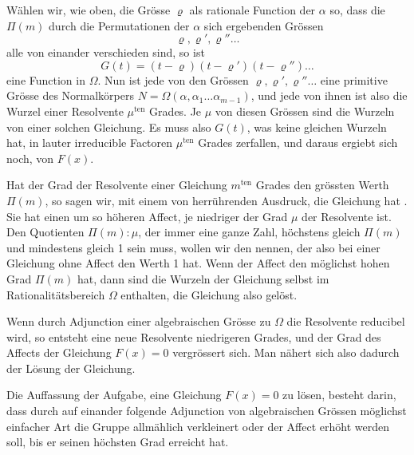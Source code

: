 
Wählen wir, wie oben, die Grösse $\varrho$ als rationale Function der $\alpha$ so, dass die $\Pi(m)$ durch die Permutationen der $\alpha$ sich ergebenden Grössen
\[
\varrho, \varrho', \varrho'' \ldots
\]
alle von einander verschieden sind, so ist
\[
G(t) = (t - \varrho)(t - \varrho')(t - \varrho'') \ldots
\]
eine Function in $\Omega$. Nun ist jede von den Grössen $\varrho, \varrho', \varrho'' \ldots$ eine primitive Grösse des Normalkörpers $N = \Omega(\alpha, \alpha_1 \ldots \alpha_{m-1})$, und jede von ihnen ist also die Wurzel einer  Resolvente $\mu^{\text{ten}}$ Grades. Je $\mu$ von diesen Grössen sind die Wurzeln von einer solchen Gleichung. Es muss also $G(t)$, was keine gleichen Wurzeln hat, in lauter irreducible Factoren $\mu^{\text{ten}}$ Grades zerfallen, und daraus ergiebt sich noch,  von $F(x)$.

Hat der Grad der  Resolvente einer Gleichung $m^{\text{ten}}$ Grades den grössten Werth $\Pi(m)$, so sagen wir, mit einem von  herrührenden Ausdruck, die Gleichung hat . Sie hat einen um so höheren Affect, je niedriger der Grad $\mu$ der  Resolvente ist. Den Quotienten $\Pi(m) : \mu$, der immer eine ganze Zahl, höchstens gleich $\Pi(m)$ und mindestens gleich 1 sein muss, wollen wir den  nennen, der also bei einer Gleichung ohne Affect den Werth 1 hat. Wenn der Affect den möglichst hohen Grad $\Pi(m)$ hat, dann sind die Wurzeln der Gleichung selbst im Rationalitätsbereich $\Omega$ enthalten, die Gleichung also gelöst.

Wenn durch Adjunction einer algebraischen Grösse zu $\Omega$ die  Resolvente reducibel wird, so entsteht eine neue Resolvente niedrigeren Grades, und der Grad des Affects der Gleichung $F(x) = 0$ vergrössert sich. Man nähert sich also dadurch der Lösung der Gleichung.

Die  Auffassung der Aufgabe, eine Gleichung $F(x) = 0$ zu lösen, besteht darin, dass durch auf einander folgende Adjunction von algebraischen Grössen möglichst einfacher Art die Gruppe allmählich verkleinert oder der Affect erhöht werden soll, bis er seinen höchsten Grad erreicht hat.

\begin{quote}
\end{quote}
